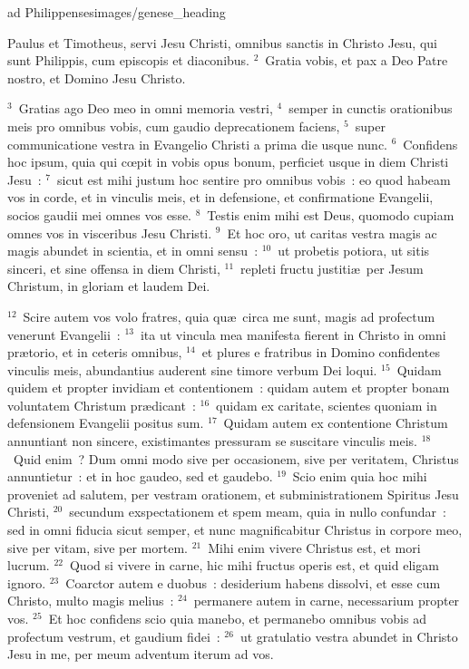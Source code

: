 {ad Philippenses}{images/genese_heading}


\lettrine[lines=10,image=true,loversize=0.05,lraise=-0.03]{P}{}aulus et Timotheus, servi Jesu Christi, omnibus sanctis in Christo Jesu, qui sunt Philippis, cum episcopis et diaconibus.
${}^{2}$~Gratia vobis, et pax a Deo Patre nostro, et Domino Jesu Christo.


${}^{3}$~Gratias ago Deo meo in omni memoria vestri,
${}^{4}$~semper in cunctis orationibus meis pro omnibus vobis, cum gaudio deprecationem faciens,
${}^{5}$~super communicatione vestra in Evangelio Christi a prima die usque nunc.
${}^{6}$~Confidens hoc ipsum, quia qui cœpit in vobis opus bonum, perficiet usque in diem Christi Jesu~:
${}^{7}$~sicut est mihi justum hoc sentire pro omnibus vobis~: eo quod habeam vos in corde, et in vinculis meis, et in defensione, et confirmatione Evangelii, socios gaudii mei omnes vos esse.
${}^{8}$~Testis enim mihi est Deus, quomodo cupiam omnes vos in visceribus Jesu Christi.
${}^{9}$~Et hoc oro, ut caritas vestra magis ac magis abundet in scientia, et in omni sensu~:
${}^{10}$~ut probetis potiora, ut sitis sinceri, et sine offensa in diem Christi,
${}^{11}$~repleti fructu justiti\ae\ per Jesum Christum, in gloriam et laudem Dei.


${}^{12}$~Scire autem vos volo fratres, quia qu\ae\ circa me sunt, magis ad profectum venerunt Evangelii~:
${}^{13}$~ita ut vincula mea manifesta fierent in Christo in omni pr\ae torio, et in ceteris omnibus,
${}^{14}$~et plures e fratribus in Domino confidentes vinculis meis, abundantius auderent sine timore verbum Dei loqui.
${}^{15}$~Quidam quidem et propter invidiam et contentionem~: quidam autem et propter bonam voluntatem Christum pr\ae dicant~:
${}^{16}$~quidam ex caritate, scientes quoniam in defensionem Evangelii positus sum.
${}^{17}$~Quidam autem ex contentione Christum annuntiant non sincere, existimantes pressuram se suscitare vinculis meis.
${}^{18}$~Quid enim~? Dum omni modo sive per occasionem, sive per veritatem, Christus annuntietur~: et in hoc gaudeo, sed et gaudebo.
${}^{19}$~Scio enim quia hoc mihi proveniet ad salutem, per vestram orationem, et subministrationem Spiritus Jesu Christi,
${}^{20}$~secundum exspectationem et spem meam, quia in nullo confundar~: sed in omni fiducia sicut semper, et nunc magnificabitur Christus in corpore meo, sive per vitam, sive per mortem.
${}^{21}$~Mihi enim vivere Christus est, et mori lucrum.
${}^{22}$~Quod si vivere in carne, hic mihi fructus operis est, et quid eligam ignoro.
${}^{23}$~Coarctor autem e duobus~: desiderium habens dissolvi, et esse cum Christo, multo magis melius~:
${}^{24}$~permanere autem in carne, necessarium propter vos.
${}^{25}$~Et hoc confidens scio quia manebo, et permanebo omnibus vobis ad profectum vestrum, et gaudium fidei~:
${}^{26}$~ut gratulatio vestra abundet in Christo Jesu in me, per meum adventum iterum ad vos.


